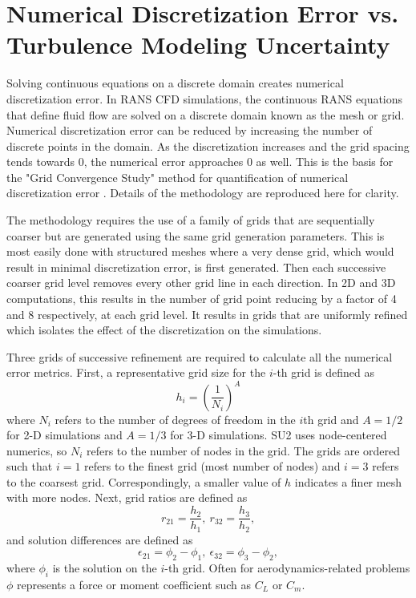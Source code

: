 \section{Numerical Discretization Error vs. Turbulence Modeling Uncertainty}\label{sec:num_vs_turb_error}

Solving continuous equations on a discrete domain creates numerical discretization error.
In RANS CFD simulations, the continuous RANS equations that define fluid flow are solved on a discrete domain known as the mesh or grid.
Numerical discretization error can be reduced by increasing the number of discrete points in the domain.
As the discretization increases and the grid spacing tends towards $0$, the numerical error approaches $0$ as well. 
This is the basis for the "Grid Convergence Study" method for quantification of numerical discretization error \cite{american_society_of_mechanical_engineers_standard_2009}.
Details of the methodology are reproduced here for clarity.

The methodology requires the use of a family of grids that are sequentially coarser but are generated using the same grid generation parameters.
This is most easily done with structured meshes where a very dense grid, which would result in minimal discretization error, is first generated.
Then each successive coarser grid level removes every other grid line in each direction.
In 2D and 3D computations, this results in the number of grid point reducing by a factor of 4 and 8 respectively, at each grid level.
It results in grids that are uniformly refined which isolates the effect of the discretization on the simulations. 

Three grids of successive refinement are required to calculate all the numerical error metrics. 
First, a representative grid size for the $i$-th grid is defined as
\begin{equation} \label{equ:grid_h}
    h_i = \left ( \frac{1}{N_i}\right )^A
\end{equation}
where $N_i$ refers to the number of degrees of freedom in the $i$th grid and $A=1/2$ for 2-D simulations and $A = 1/3$ for 3-D simulations.
SU2 uses node-centered numerics, so $N_i$ refers to the number of nodes in the grid.
The grids are ordered such that $i=1$ refers to the finest grid (most number of nodes) and $i=3$ refers to the coarsest grid.
Correspondingly, a smaller value of $h$ indicates a finer mesh with more nodes. 
Next, grid ratios are defined as 
\begin{equation}
    r_{21} = \frac{h_2}{h_1},~r_{32} = \frac{h_3}{h_2},
\end{equation}
and solution differences are defined as
\begin{equation}
    \epsilon_{21} = \phi_2 - \phi_1,~\epsilon_{32} = \phi_3 - \phi_2,
\end{equation}
where $\phi_i$ is the solution on the $i$-th grid.
Often for aerodynamics-related problems $\phi$ represents a force or moment coefficient such as $C_L$ or $C_m$.

